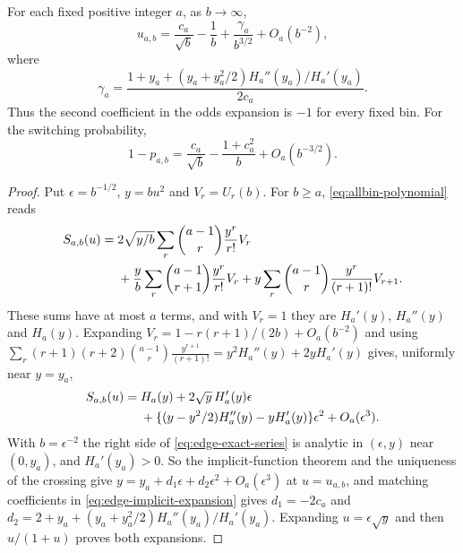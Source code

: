 \begin{theorem}\label{thm:edge-laguerre}
For each fixed positive integer $a$, as $b\to\infty$,
\begin{equation}\label{eq:edge-crossing-expansion}
 u_{a,b}=\frac{c_a}{\sqrt b}-\frac1b
 +\frac{\gamma_a}{b^{3/2}}+O_a(b^{-2}),
\end{equation}
where
\[
 \gamma_a=
 \frac{1+y_a+(y_a+y_a^2/2)H_a''(y_a)/H_a'(y_a)}{2c_a}.
\]
Thus the second coefficient in the odds expansion is $-1$ for every fixed
bin. For the switching probability,
\begin{equation}\label{eq:edge-q-expansion}
 1-p_{a,b}=\frac{c_a}{\sqrt b}-\frac{1+c_a^2}{b}+O_a(b^{-3/2}).
\end{equation}
\end{theorem}
\begin{proof}
Put $\epsilon=b^{-1/2}$, $y=bu^2$ and $V_r=U_r(b)$. For $b\ge a$,
\eqref{eq:allbin-polynomial} reads
\begin{align}
 S_{a,b}(u)={}&2\sqrt{y/b}\sum_r\binom{a-1}{r}\frac{y^r}{r!}V_r\notag\\
 &+\frac yb\sum_r\binom{a-1}{r+1}\frac{y^r}{r!}V_r
 +y\sum_r\binom{a-1}{r}\frac{y^r}{(r+1)!}V_{r+1}.
 \label{eq:edge-exact-series}
\end{align}
These sums have at most $a$ terms, and with $V_r=1$ they are $H_a'(y)$,
$H_a''(y)$ and $H_a(y)$. Expanding $V_r=1-r(r+1)/(2b)+O_a(b^{-2})$ and using
$\sum_r(r+1)(r+2)\binom{a-1}{r}\frac{y^{r+1}}{(r+1)!}=y^2H_a''(y)+2yH_a'(y)$
gives, uniformly near $y=y_a$,
\begin{align}
 S_{a,b}(u)={}&H_a(y)+2\sqrt y\,H_a'(y)\epsilon\notag\\
 &+\{(y-y^2/2)H_a''(y)-yH_a'(y)\}\epsilon^2+O_a(\epsilon^3).
 \label{eq:edge-implicit-expansion}
\end{align}
With $b=\epsilon^{-2}$ the right side of \eqref{eq:edge-exact-series} is
analytic in $(\epsilon,y)$ near $(0,y_a)$, and $H_a'(y_a)>0$. So the
implicit-function theorem and the uniqueness of the crossing give
$y=y_a+d_1\epsilon+d_2\epsilon^2+O_a(\epsilon^3)$ at $u=u_{a,b}$, and matching
coefficients in \eqref{eq:edge-implicit-expansion} gives $d_1=-2c_a$ and
$d_2=2+y_a+(y_a+y_a^2/2)H_a''(y_a)/H_a'(y_a)$. Expanding $u=\epsilon\sqrt y$
and then $u/(1+u)$ proves both expansions.
\end{proof}

